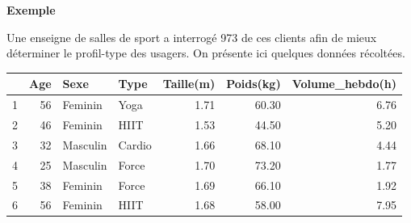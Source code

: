 \documentclass[aspectratio=169,xcolor=dvipsnames]{beamer}
\begin{document}
\begin{frame}

	\begin{exampleblock}{\textbf{Exemple}}

	Une enseigne de salles de sport a interrogé 973 de ces clients afin de mieux déterminer le \og profil-type \fg{} des usagers. On présente ici quelques données récoltées.

		\begin{center}
		\begin{tabular}{rrllrrr}
  \hline
 & Age & Sexe & Type & Taille(m) & Poids(kg) & Volume\_hebdo(h) \\ 
  \hline
1 &  56 & Feminin & Yoga & 1.71 & 60.30 & 6.76 \\ 
  2 &  46 & Feminin & HIIT & 1.53 & 44.50 & 5.20 \\ 
  3 &  32 & Masculin & Cardio & 1.66 & 68.10 & 4.44 \\ 
  4 &  25 & Masculin & Force & 1.70 & 73.20 & 1.77 \\ 
  5 &  38 & Feminin & Force & 1.69 & 66.10 & 1.92 \\ 
  6 &  56 & Feminin & HIIT & 1.68 & 58.00 & 7.95 \\ 
   \hline
		\end{tabular}
		\end{center}

	\end{exampleblock}

\end{frame}
\end{document}
